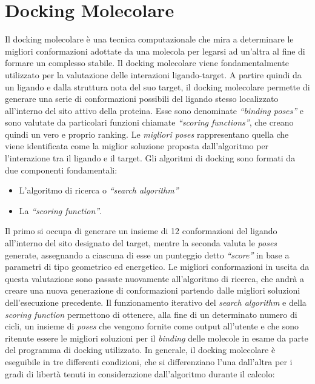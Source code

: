 \section{Docking Molecolare}
Il docking molecolare è una tecnica computazionale che mira a determinare le migliori conformazioni adottate da una molecola per legarsi ad un’altra al fine di formare un complesso stabile. Il docking molecolare viene fondamentalmente utilizzato per la valutazione delle interazioni ligando-target. A partire quindi da un ligando e dalla struttura nota del suo target, il docking molecolare permette di generare una serie di conformazioni possibili del ligando stesso localizzato all’interno del sito attivo della proteina. Esse sono denominate \textit{“binding poses”} e sono valutate da particolari funzioni chiamate \textit{“scoring functions”}, che creano quindi un vero e proprio ranking. Le \textit{migliori poses} rappresentano quella che viene identificata come la miglior soluzione proposta dall’algoritmo per l’interazione tra il ligando e il target\cite{meng2011molecular}.\newline
Gli algoritmi di docking sono formati da due componenti fondamentali:

\begin{itemize}
    \item L’algoritmo di ricerca o \textit{“search algorithm”}
    \item La \textit{“scoring function”}.
\end{itemize} 

Il primo si occupa di generare un insieme di 12 conformazioni del ligando all’interno del sito designato del target, mentre la seconda valuta le \textit{poses} generate, assegnando a ciascuna di esse un punteggio detto \textit{“score”} in base a parametri di tipo geometrico ed energetico. Le migliori conformazioni in uscita da questa valutazione sono passate nuovamente all’algoritmo di ricerca, che andrà a creare una nuova generazione di conformazioni partendo dalle migliori soluzioni dell'esecuzione precedente. Il funzionamento iterativo del \textit{search algorithm} e della \textit{scoring function} permettono di ottenere, alla fine di un determinato numero di cicli, un insieme di \textit{poses} che vengono fornite come output all’utente e che sono ritenute essere le migliori soluzioni per il \textit{binding} delle molecole in esame da parte del programma di docking utilizzato.\newline
In generale, il docking molecolare è eseguibile in tre differenti condizioni, che si differenziano l’una dall’altra per i gradi di libertà tenuti in considerazione dall’algoritmo durante il calcolo: 

